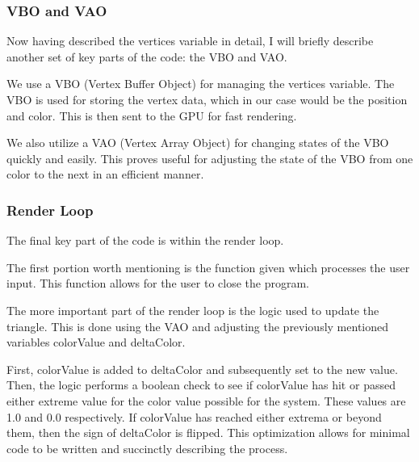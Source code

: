\newpage

\subsubsection{VBO and VAO}

Now having described the vertices variable in detail, I will briefly describe another set of key parts of the code: the VBO and VAO.

We use a VBO (Vertex Buffer Object) for managing the vertices variable.
The VBO is used for storing the vertex data, which in our case would be the position and color.
This is then sent to the GPU for fast rendering.

We also utilize a VAO (Vertex Array Object) for changing states of the VBO quickly and easily.
This proves useful for adjusting the state of the VBO from one color to the next in an efficient manner.

\subsubsection{Render Loop}

The final key part of the code is within the render loop.

The first portion worth mentioning is the function given which processes the user input.
This function allows for the user to close the program.

The more important part of the render loop is the logic used to update the triangle.
This is done using the VAO and adjusting the previously mentioned variables colorValue and deltaColor.

First, colorValue is added to deltaColor and subsequently set to the new value.
Then, the logic performs a boolean check to see if colorValue has hit or passed either extreme value for the color value possible for the system.
These values are 1.0 and 0.0 respectively.
If colorValue has reached either extrema or beyond them, then the sign of deltaColor is flipped.
This optimization allows for minimal code to be written and succinctly describing the process.

